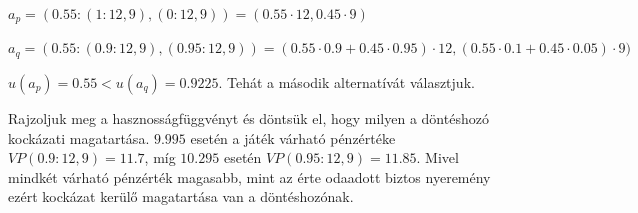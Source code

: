 \documentclass[a4paper,12pt]{article}
\begin{document}
$a_p = (0.55:(1: 12,9),(0: 12,9)) = (0.55 \cdot 12, 0.45 \cdot 9)$

$a_q = (0.55:(0.9: 12,9),(0.95: 12,9)) = (0.55 \cdot 0.9 + 0.45 \cdot 0.95) \cdot 12, (0.55 \cdot 0.1 + 0.45 \cdot 0.05) \cdot 9)$

$u(a_p) = 0.55  < u(a_q) = 0.9225$. Tehát a második alternatívát választjuk.

Rajzoljuk meg a hasznosságfüggvényt és döntsük el, hogy milyen a döntéshozó kockázati magatartása. $9.995$ esetén a játék várható pénzértéke $VP(0.9: 12,9)=11.7$, míg $10.295$ esetén $VP(0.95: 12,9)=11.85$. Mivel mindkét várható pénzérték magasabb, mint az érte odaadott biztos nyeremény ezért kockázat kerülő magatartása van a döntéshozónak.





\end{document}
